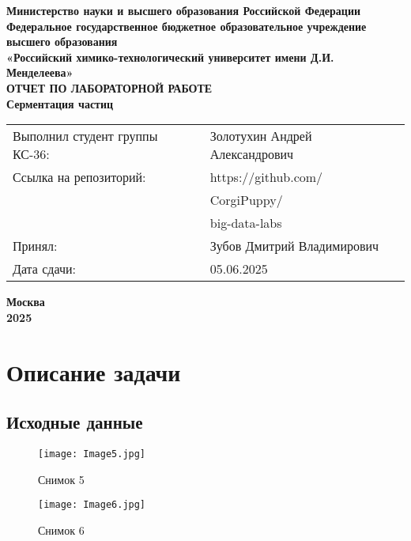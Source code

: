 \documentclass[12pt, a4paper]{report}
\begin{document}
	\begin{titlepage}
		\begin{center}
			\large \textbf{Министерство науки и высшего образования Российской Федерации} \\
			\large \textbf{Федеральное государственное бюджетное образовательное учреждение высшего образования} \\
			\large \textbf{«Российский химико-технологический университет имени Д.И. Менделеева»} \\

			\vspace*{4cm}
			\LARGE \textbf{ОТЧЕТ ПО ЛАБОРАТОРНОЙ РАБОТЕ} \\
			\Large \textbf{Серментация частиц}

			\vspace*{4cm}
			\begin{flushright}
				\Large
				\begin{tabular}{>{\raggedleft\arraybackslash}p{9cm} p{10cm}}
					Выполнил студент группы КС-36: & Золотухин Андрей Александрович \\
					Ссылка на репозиторий: & https://github.com/ \\
					& CorgiPuppy/ \\
					& big-data-labs \\
					Принял: & Зубов Дмитрий Владимирович \\
					Дата сдачи: & 05.06.2025 \\
				\end{tabular}
			\end{flushright}

			\vspace*{5cm}
			\Large \textbf{Москва \\ 2025}
		\end{center}
	\end{titlepage}

	\tableofcontents
	\thispagestyle{empty}
	\newpage


	\section*{Описание задачи}
	\large

	\subsection*{Исходные данные}
	\large
	\begin{figure}[h]
		\texttt{[image: Image5.jpg]}
		\caption{Снимок 5}
	\end{figure}
	\begin{figure}[h]
		\texttt{[image: Image6.jpg]}
		\caption{Снимок 6}
	\end{figure}
\end{document}
